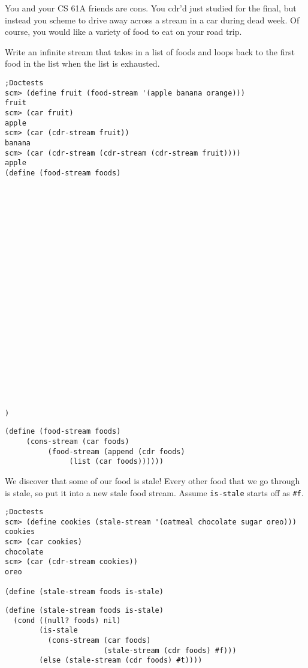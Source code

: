 \begin{blocksection}

\question
You and your CS 61A friends are cons.
You cdr'd just studied for the final, but instead you scheme to drive away across a stream in a car during dead week.
Of course, you would like a variety of food to eat on your road trip.

Write an infinite stream that takes in a list of foods and loops back to the
first food in the list when the list is exhausted.

\ifprintanswers\else

\begin{lstlisting}
;Doctests
scm> (define fruit (food-stream '(apple banana orange)))
fruit
scm> (car fruit)
apple
scm> (car (cdr-stream fruit))
banana
scm> (car (cdr-stream (cdr-stream (cdr-stream fruit))))
apple
(define (food-stream foods)























)

\end{lstlisting}
\fi

\begin{solution}[1in]
\begin{lstlisting}
(define (food-stream foods)
     (cons-stream (car foods)
          (food-stream (append (cdr foods)
               (list (car foods))))))
\end{lstlisting}
\end{solution}
\newpage
\end{blocksection}
\begin{blocksection}

We discover that some of our food is stale! Every other food that we go
through is stale, so put it into a new stale food stream. Assume
\lstinline$is-stale$ starts off as \lstinline$#f$.

\ifprintanswers\else
\begin{lstlisting}
;Doctests
scm> (define cookies (stale-stream '(oatmeal chocolate sugar oreo)))
cookies
scm> (car cookies)
chocolate
scm> (car (cdr-stream cookies))
oreo

(define (stale-stream foods is-stale)
\end{lstlisting}
\fi

\begin{solution}[1in]
\begin{lstlisting}
(define (stale-stream foods is-stale)
  (cond ((null? foods) nil)
        (is-stale
          (cons-stream (car foods)
                       (stale-stream (cdr foods) #f)))
        (else (stale-stream (cdr foods) #t))))
\end{lstlisting}
\end{solution}


\end{blocksection}


